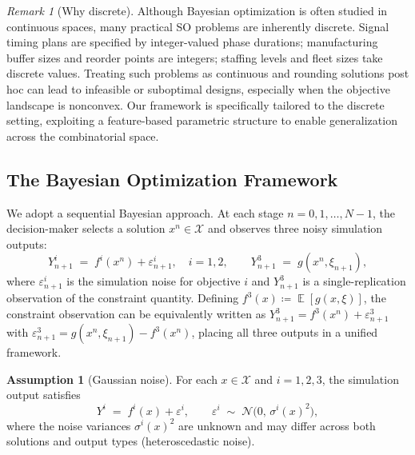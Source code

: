\documentclass[12pt]{article}
\theoremstyle{plain}
\theoremstyle{definition}
\newtheorem{assumption}{Assumption}[section]
\theoremstyle{remark}
\newtheorem{remark}{Remark}[section]
\DeclareMathOperator{\E}{\mathbb{E}}
\newcommand{\cX}{\mathcal{X}}
\newcommand{\cN}{\mathcal{N}}
\begin{document}
\begin{remark}[Why discrete]\label{rem:discrete}
Although Bayesian optimization is often studied in continuous spaces,
many practical SO problems are inherently discrete.  Signal timing
plans are specified by integer-valued phase durations; manufacturing
buffer sizes and reorder points are integers; staffing levels and
fleet sizes take discrete values.  Treating such problems as
continuous and rounding solutions post hoc can lead to infeasible or
suboptimal designs, especially when the objective landscape is
nonconvex.  Our framework is specifically tailored to the discrete
setting, exploiting a feature-based parametric structure to enable
generalization across the combinatorial space.
\end{remark}

\subsection{The Bayesian Optimization Framework}\label{sec:BO_framework}

We adopt a sequential Bayesian approach.  At each stage
$n=0,1,\ldots,N-1$, the decision-maker selects a solution
$x^n\in\cX$ and observes three noisy simulation outputs:
\begin{equation}\label{eq:observations}
  Y^i_{n+1} \;=\; f^i(x^n) + \varepsilon^i_{n+1}, \quad i=1,2,
  \qquad
  Y^3_{n+1} \;=\; g(x^n,\xi_{n+1}),
\end{equation}
where $\varepsilon^i_{n+1}$ is the simulation noise for objective $i$
and $Y^3_{n+1}$ is a single-replication observation of the constraint
quantity.  Defining $f^3(x)\coloneqq\E[g(x,\xi)]$, the constraint
observation can be equivalently written as
$Y^3_{n+1} = f^3(x^n) + \varepsilon^3_{n+1}$ with
$\varepsilon^3_{n+1} = g(x^n,\xi_{n+1}) - f^3(x^n)$, placing all three
outputs in a unified framework.

\begin{assumption}[Gaussian noise]\label{as:gaussian}
For each $x\in\cX$ and $i=1,2,3$, the simulation output satisfies
\begin{equation}\label{eq:gaussian_noise}
  Y^i \;=\; f^i(x) + \varepsilon^i, \qquad
  \varepsilon^i \;\sim\; \cN\!\bigl(0,\,\sigma^i(x)^2\bigr),
\end{equation}
where the noise variances
$\sigma^i(x)^2$ are unknown and may differ across both solutions
and output types (heteroscedastic noise).
\end{assumption}
\end{document}

